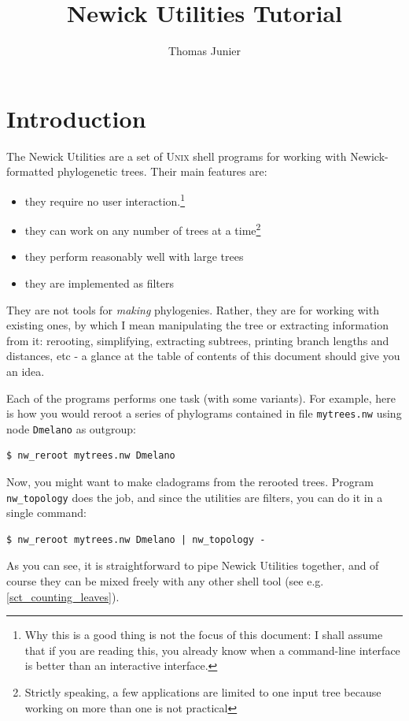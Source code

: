 \documentclass[a4paper,10pt]{report}
\title{Newick Utilities Tutorial}
\author{Thomas Junier}
\newcommand{\nutils}{Newick Utilities}
\newcommand{\unix}{\textsc{Unix}}
\newcommand{\topology}{\texttt{nw\_topology}}
\theoremstyle{definition}
\begin{document}
\maketitle
\tableofcontents

\chapter{Introduction}

The \nutils{} are a set of \unix{} shell programs for working with Newick-formatted phylogenetic trees. Their main features are:
\begin{itemize}
 \item they require no user interaction.\footnote{Why this is a good thing is not the focus of this document: I shall assume that if you are reading this, you already know when a command-line interface is better than an interactive interface.}
 \item they can work on any number of trees at a time\footnote{Strictly speaking, a few applications are limited to one input tree because working on more than one is not practical}
 \item they perform reasonably well with large trees
 \item they are implemented as filters
\end{itemize}
They are not tools for \emph{making} phylogenies. Rather, they are for working with existing ones, by which I mean manipulating the tree or extracting information from it: rerooting, simplifying, extracting subtrees, printing branch lengths and distances, etc - a glance at the table of contents of this document should give you an idea.

Each of the programs performs one task (with some variants). For example, here is how you would reroot a series of phylograms contained in file \texttt{mytrees.nw} using node \texttt{Dmelano} as outgroup:

\begin{verbatim}
$ nw_reroot mytrees.nw Dmelano
\end{verbatim} 
Now, you might want to make cladograms from the rerooted trees. Program \topology{} does the job, and since the utilities are filters, you can do it in a single command:
\begin{verbatim}
$ nw_reroot mytrees.nw Dmelano | nw_topology -
\end{verbatim}
As you can see, it is straightforward to pipe \nutils{} together, and of course they can be mixed freely with any other shell tool (see e.g. \ref{sct_counting_leaves}).
\end{document}

